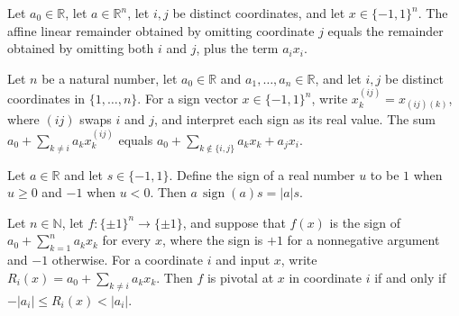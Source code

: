 \begin{theorem}
\label{FABL.affineLinearRemainder_eq_two_add}
\leanok
{}
Let $a_0\in\mathbb{R}$, let $a\in\mathbb{R}^n$, let $i,j$ be distinct coordinates, and
let $x\in\{-1,1\}^n$. The affine linear remainder obtained by omitting coordinate $j$
equals the remainder obtained by omitting both $i$ and $j$, plus the term $a_ix_i$.
\end{theorem}

\begin{theorem}
\label{FABL.affineLinearRemainder_permute_swap_eq}
\leanok
{}
Let $n$ be a natural number, let $a_0\in\mathbb R$ and $a_1,\ldots,a_n\in\mathbb R$, and
let $i,j$ be distinct coordinates in $\{1,\ldots,n\}$. For a sign vector
$x\in\{-1,1\}^n$, write $x^{(ij)}_k=x_{(ij)(k)}$, where $(ij)$ swaps $i$ and $j$, and
interpret each sign as its real value. The sum $a_0+\sum_{k\ne i}a_k x^{(ij)}_k$ equals
$a_0+\sum_{k\notin\{i,j\}}a_k x_k+a_jx_i$.
\end{theorem}

\begin{theorem}
\label{FABL.mul_signValue_thresholdSign_mul}
\leanok
{}
Let $a\in\mathbb R$ and let $s\in\{ -1,1\}$. Define the sign of a real number $u$ to be
$1$ when $u\ge0$ and $-1$ when $u<0$. Then $a\,\operatorname{sign}(a)s=|a|s$.
\end{theorem}

\begin{theorem}
\label{FABL.isPivotal_linearThreshold_iff}
\leanok
{}
Let $n\in\mathbb N$, let $f:\{\pm1\}^n\to\{\pm1\}$, and suppose that $f(x)$ is the sign
of $a_0+\sum_{k=1}^n a_k x_k$ for every $x$, where the sign is $+1$ for a nonnegative
argument and $-1$ otherwise. For a coordinate $i$ and input $x$, write
$R_i(x)=a_0+\sum_{k\ne i}a_kx_k$. Then $f$ is pivotal at $x$ in coordinate $i$ if and
only if $-|a_i|\le R_i(x)<|a_i|$.
\end{theorem}

